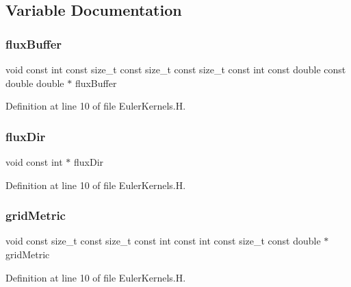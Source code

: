\subsection{Variable Documentation}
\hypertarget{EulerKernels_8H_a6cb12eed023c9e1d730140bde52292bf}{}\label{EulerKernels_8H_a6cb12eed023c9e1d730140bde52292bf} 
\subsubsection{\texorpdfstring{flux\+Buffer}{fluxBuffer}}
{\footnotesize\ttfamily void const int const size\+\_\+t const size\+\_\+t const size\+\_\+t const int const double const double double $\ast$ flux\+Buffer}



Definition at line 10 of file Euler\+Kernels.\+H.

\hypertarget{EulerKernels_8H_ab29bdde281c96d3ace8c96f53cea3e7e}{}\label{EulerKernels_8H_ab29bdde281c96d3ace8c96f53cea3e7e} 
\subsubsection{\texorpdfstring{flux\+Dir}{fluxDir}}
{\footnotesize\ttfamily void const int $\ast$ flux\+Dir}



Definition at line 10 of file Euler\+Kernels.\+H.

\hypertarget{EulerKernels_8H_a50e8052dd93fbd0508409959216200f9}{}\label{EulerKernels_8H_a50e8052dd93fbd0508409959216200f9} 
\subsubsection{\texorpdfstring{grid\+Metric}{gridMetric}}
{\footnotesize\ttfamily void const size\+\_\+t const size\+\_\+t const int const int const size\+\_\+t const double $\ast$ grid\+Metric}



Definition at line 10 of file Euler\+Kernels.\+H.

\hypertarget{EulerKernels_8H_a25a65154b8b8819da9bf4e0ecef40fa1}{}\label{EulerKernels_8H_a25a65154b8b8819da9bf4e0ecef40fa1} 
